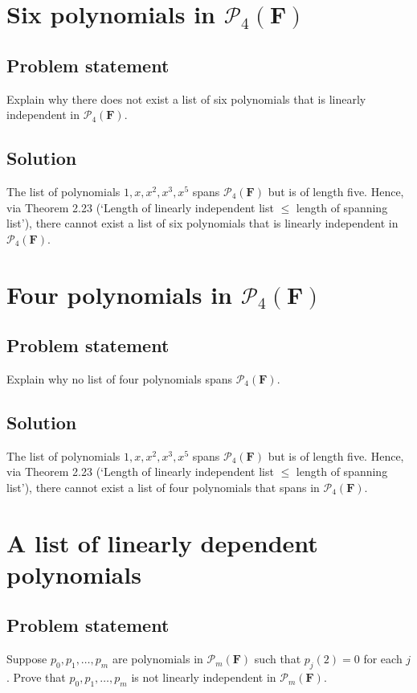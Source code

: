 \documentclass{article}
\begin{document}
\clearpage

\renewcommand{\thesection}{12}
\section{Six polynomials in $\mathcal{P}_4(\mathbf{F})$}
\subsection*{Problem statement}
Explain why there does not exist a list of six polynomials that is linearly independent in $\mathcal{P}_4(\mathbf{F})$.

\subsection*{Solution}
The list of polynomials $1,x,x^2,x^3,x^5$ spans $\mathcal{P}_4(\mathbf{F})$ but is of length five. 
Hence, via Theorem 2.23 (`Length of linearly independent list $\leq$ length of spanning list'), there cannot exist a list of six polynomials that is linearly independent in $\mathcal{P}_4(\mathbf{F})$.

\clearpage

\renewcommand{\thesection}{13}
\section{Four polynomials in $\mathcal{P}_4(\mathbf{F})$}
\subsection*{Problem statement}
Explain why no list of four polynomials spans $\mathcal{P}_4(\mathbf{F})$.

\subsection*{Solution}
The list of polynomials $1,x,x^2,x^3,x^5$ spans $\mathcal{P}_4(\mathbf{F})$ but is of length five. 
Hence, via Theorem 2.23 (`Length of linearly independent list $\leq$ length of spanning list'), there cannot exist a list of four polynomials that spans in $\mathcal{P}_4(\mathbf{F})$.

\clearpage

\renewcommand{\thesection}{17}
\section{A list of linearly dependent polynomials}
\subsection*{Problem statement}
Suppose $p_0,p_1,\ldots,p_m$ are polynomials in $\mathcal{P}_m(\mathbf{F})$ such that $p_j(2)=0$ for each $j$. 
Prove that $p_0,p_1,\ldots,p_m$ is not linearly independent in $\mathcal{P}_m(\mathbf{F})$.
\end{document}
